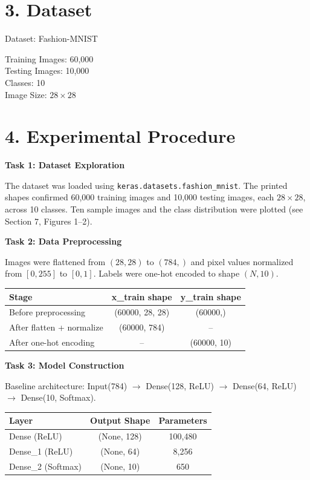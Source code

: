 \documentclass[11pt]{article}
\begin{document}
\section*{3. Dataset}
Dataset: Fashion-MNIST

Training Images: 60,000 \\
Testing Images: 10,000 \\
Classes: 10 \\
Image Size: $28\times28$

\section*{4. Experimental Procedure}

\textbf{Task 1: Dataset Exploration}

The dataset was loaded using \texttt{keras.datasets.fashion\_mnist}. The printed shapes confirmed 60,000 training images and 10,000 testing images, each $28\times28$, across 10 classes. Ten sample images and the class distribution were plotted (see Section 7, Figures 1--2).

\bigskip

\textbf{Task 2: Data Preprocessing}

Images were flattened from $(28,28)$ to $(784,)$ and pixel values normalized from $[0,255]$ to $[0,1]$. Labels were one-hot encoded to shape $(N,10)$.

\begin{center}
\begin{tabular}{|l|c|c|}
\hline
Stage & x\_train shape & y\_train shape\\
\hline
Before preprocessing & (60000, 28, 28) & (60000,)\\
After flatten + normalize & (60000, 784) & --\\
After one-hot encoding & -- & (60000, 10)\\
\hline
\end{tabular}
\end{center}

\bigskip

\textbf{Task 3: Model Construction}

Baseline architecture: Input(784) $\rightarrow$ Dense(128, ReLU) $\rightarrow$ Dense(64, ReLU) $\rightarrow$ Dense(10, Softmax).

\begin{center}
\begin{tabular}{|l|c|c|}
\hline
Layer & Output Shape & Parameters\\
\hline
Dense (ReLU) & (None, 128) & 100,480\\
Dense\_1 (ReLU) & (None, 64) & 8,256\\
Dense\_2 (Softmax) & (None, 10) & 650\\
\hline
\end{tabular}
\end{center}
\end{document}
